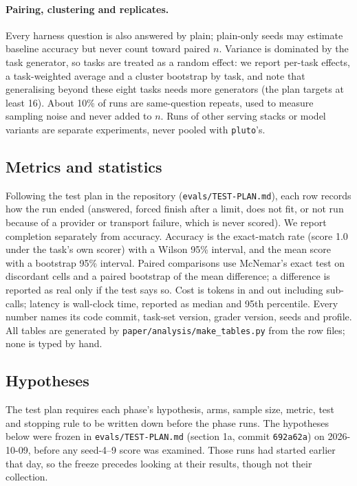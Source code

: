 \documentclass[11pt]{article}
\newcommand{\code}[1]{\texttt{#1}}
\begin{document}
\paragraph{Pairing, clustering and replicates.} Every harness question is also answered
by plain; plain-only seeds may estimate baseline accuracy but never count toward paired
$n$. Variance is dominated by the task generator, so tasks are treated as a random effect:
we report per-task effects, a task-weighted average and a cluster bootstrap by task, and
note that generalising beyond these eight tasks needs more generators (the plan targets at
least 16). About 10\% of runs are same-question repeats, used to measure sampling noise and
never added to $n$. Runs of other serving stacks or model variants are separate
experiments, never pooled with \code{pluto}'s.

\subsection{Metrics and statistics}
Following the test plan in the repository (\code{evals/TEST-PLAN.md}), each row
records how the run ended (answered, forced finish after a limit, does not fit, or
not run because of a provider or transport failure, which is never scored). We
report completion separately from accuracy. Accuracy is the exact-match rate
(score 1.0 under the task's own scorer) with a Wilson 95\% interval, and the mean
score with a bootstrap 95\% interval. Paired comparisons use McNemar's exact test on
discordant cells and a paired bootstrap of the mean difference; a difference is
reported as real only if the test says so. Cost is tokens in and out including
sub-calls; latency is wall-clock time, reported as median and 95th percentile.
Every number names its code commit, task-set version, grader version, seeds and
profile. All tables are generated by \code{paper/analysis/make\_tables.py} from the
row files; none is typed by hand.

\subsection{Hypotheses}
\label{sec:hypotheses}
The test plan requires each phase's hypothesis, arms, sample size, metric, test and
stopping rule to be written down before the phase runs. The hypotheses below were
frozen in \code{evals/TEST-PLAN.md} (section 1a, commit \code{692a62a}) on 2026-10-09,
before any seed-4--9 score was examined. Those runs had started earlier that day, so the
freeze precedes looking at their results, though not their collection.
\end{document}
